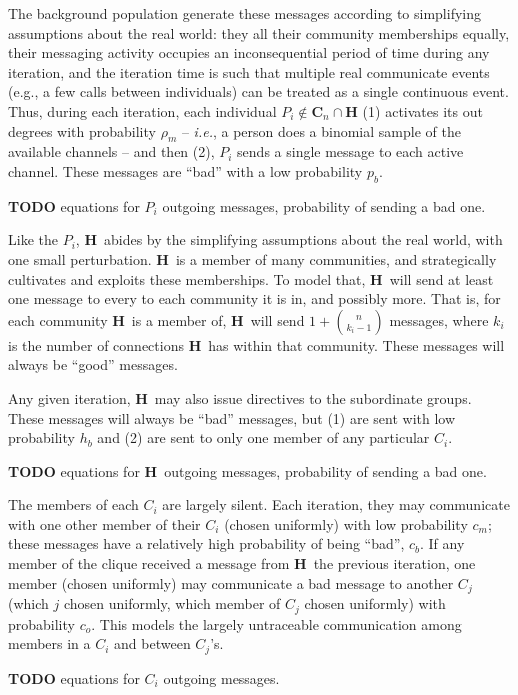 \documentclass{article}
\newcommand{\Hub}[0]{\ensuremath{\mathbf{H}}}
\newcommand{\C}[1]{\ensuremath{\mathbf{C}_{#1}}}
\begin{document}
The background population generate these messages according to simplifying assumptions about the real world: they all their community memberships equally, their messaging activity occupies an inconsequential period of time during any iteration, and the iteration time is such that multiple real communicate events (e.g., a few calls between individuals) can be treated as a single continuous event.  Thus, during each iteration, each individual $P_i\notin\C{n}\cap\Hub$ (1) activates its out degrees with probability $\rho_m$ -- {\em i.e.}, a person does a binomial sample of the available channels -- and then (2), $P_i$ sends a single message to each active channel.  These messages are ``bad'' with a low probability $p_b$.

{\bf TODO} equations for $P_i$ outgoing messages, probability of sending a bad one.

Like the $P_i$, \Hub\ abides by the simplifying assumptions about the real world, with one small perturbation.  \Hub\ is a member of many communities, and strategically cultivates and exploits these memberships.  To model that, \Hub\ will send at least one message to every to each community it is in, and possibly more.  That is, for each community \Hub\ is a member of, \Hub\ will send $1+{n\choose k_i-1}$ messages, where $k_i$ is the number of connections \Hub\ has within that community.  These messages will always be ``good'' messages.

Any given iteration, \Hub\ may also issue directives to the subordinate groups.  These messages will always be ``bad'' messages, but (1) are sent with low probability $h_b$ and (2) are sent to only one member of any particular $C_i$.

{\bf TODO} equations for \Hub\ outgoing messages, probability of sending a bad one.

The members of each $C_i$ are largely silent.  Each iteration, they may communicate with one other member of their $C_i$ (chosen uniformly) with low probability $c_m$; these messages have a relatively high probability of being ``bad'', $c_b$.  If any member of the clique received a message from \Hub\ the previous iteration, one member (chosen uniformly) may communicate a bad message to another $C_j$ (which $j$ chosen uniformly, which member of $C_j$ chosen uniformly) with probability $c_o$.  This models the largely untraceable communication among members in a $C_i$ and between $C_j$'s.

{\bf TODO} equations for $C_i$ outgoing messages.
\end{document}
